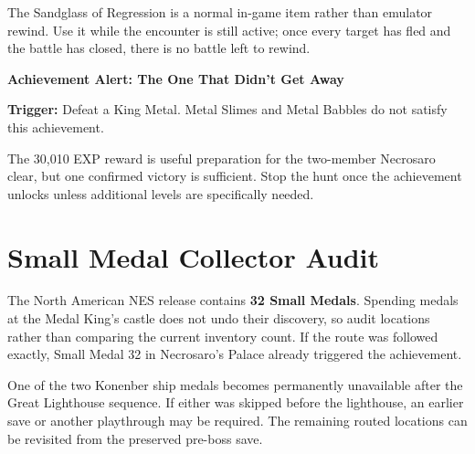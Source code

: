 \documentclass[
  american,
  10pt,
  letterpaper,
  oneside,
  open=any]{scrreprt}
\begin{document}
The Sandglass of Regression is a normal in-game item rather than
emulator rewind. Use it while the encounter is still active; once every
target has fled and the battle has closed, there is no battle left to
rewind.

\begin{achievementalert}

\textbf{Achievement Alert: The One That Didn't Get Away}

\textbf{Trigger:} Defeat a King Metal. Metal Slimes and Metal Babbles do
not satisfy this achievement.

\end{achievementalert}

The 30,010 EXP reward is useful preparation for the two-member Necrosaro
clear, but one confirmed victory is sufficient. Stop the hunt once the
achievement unlocks unless additional levels are specifically needed.

\section{Small Medal Collector Audit}\label{small-medal-collector-audit}

The North American NES release contains \textbf{32 Small Medals}.
Spending medals at the Medal King's castle does not undo their
discovery, so audit locations rather than comparing the current
inventory count. If the route was followed exactly, Small Medal 32 in
Necrosaro's Palace already triggered the achievement.

One of the two Konenber ship medals becomes permanently unavailable
after the Great Lighthouse sequence. If either was skipped before the
lighthouse, an earlier save or another playthrough may be required. The
remaining routed locations can be revisited from the preserved pre-boss
save.
\end{document}
